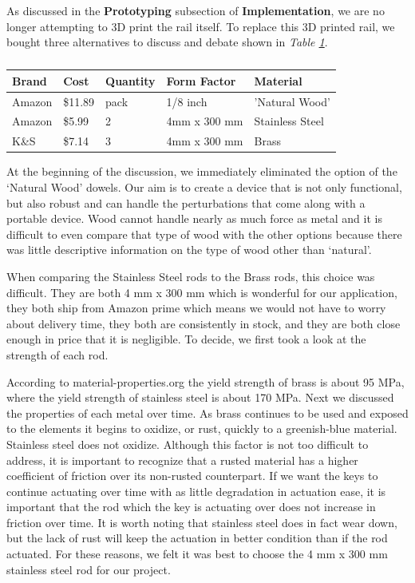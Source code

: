 As discussed in the \textbf{Prototyping} subsection of \textbf{Implementation}, we are no longer attempting to 3D print the rail itself. To replace this 3D printed rail, we bought three alternatives to discuss and debate shown in \textit{Table \ref{Tab:rail_brand}}.

\begin{table}[]
  \centering
  \begin{tabular}{|l|l|l|l|l|}
    \hline
    Brand  & Cost    & Quantity & Form Factor  & Material        \\ \hline
    Amazon & \$11.89 & pack     & 1/8 inch     & 'Natural Wood'  \\ \hline
    Amazon & \$5.99  & 2        & 4mm x 300 mm & Stainless Steel \\ \hline
    K\&S   & \$7.14  & 3        & 4mm x 300 mm & Brass           \\ \hline
  \end{tabular}
  \caption{}
  \label{Tab:rail_brand}
\end{table}

At the beginning of the discussion, we immediately eliminated the option of the ‘Natural Wood’ dowels. Our aim is to create a device that is not only functional, but also robust and can handle the perturbations that come along with a portable device. Wood cannot handle nearly as much force as metal and it is difficult to even compare that type of wood with the other options because there was little descriptive information on the type of wood other than ‘natural’.

When comparing the Stainless Steel rods to the Brass rods, this choice was difficult. They are both 4 mm x 300 mm which is wonderful for our application, they both ship from Amazon prime which means we would not have to worry about delivery time, they both are consistently in stock, and they are both close enough in price that it is negligible. To decide, we first took a look at the strength of each rod.

According to material-properties.org the yield strength of brass is about 95 MPa, where the yield strength of stainless steel is about 170 MPa. Next we discussed the properties of each metal over time. As brass continues to be used and exposed to the elements it begins to oxidize, or rust, quickly to a greenish-blue material. Stainless steel does not oxidize. Although this factor is not too difficult to address, it is important to recognize that a rusted material has a higher coefficient of friction over its non-rusted counterpart. If we want the keys to continue actuating over time with as little degradation in actuation ease, it is important that the rod which the key is actuating over does not increase in friction over time. It is worth noting that stainless steel does in fact wear down, but the lack of rust will keep the actuation in better condition than if the rod actuated. For these reasons, we felt it was best to choose the 4 mm x 300 mm stainless steel rod for our project.

